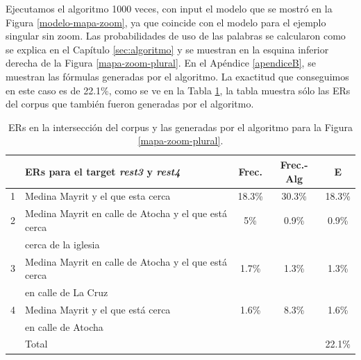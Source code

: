 Ejecutamos el algoritmo 1000 veces, con input el modelo que se mostr\'o en la Figura \ref{modelo-mapa-zoom}, ya que coincide con el modelo para el ejemplo singular sin zoom. Las probabilidades de uso de las palabras se calcularon como se explica en el Cap\'itulo \ref{sec:algoritmo} y se muestran en la esquina inferior derecha de la Figura \ref{mapa-zoom-plural}. En el Ap\'endice \ref{apendiceB}, se muestran las f\'ormulas generadas por el algoritmo. La exactitud que conseguimos en este caso es de 22.1\%, como se ve en la Tabla \ref{compara-mapa-pluralFin}, la tabla muestra s\'olo las ERs del corpus que tambi\'en fueron generadas por el algoritmo.

\bigskip

\begin{table}[h]
{\footnotesize
\begin{center}
\begin{tabular}{|l|l|c|c|c|}
\hline
&ERs para el target {\it rest3} y {\it rest4}				  &  Frec.  & Frec.-Alg &E\\ \hline \hline
1&Medina Mayrit y el que esta cerca        					  &	18.3\%  &   30.3\%  &18.3\% \\ \hline

2&Medina Mayrit en calle de Atocha y el que est\'a cerca      &   5\%	&  0.9\% &0.9\% \\
&cerca de la iglesia				                          &	        &		& \\ \hline
3 & Medina Mayrit en calle de Atocha y el que est\'a cerca	  &  1.7\%  &  1.3\%& 1.3\% \\
&en calle de La Cruz	                                      &	        &		& \\ \hline

4&Medina Mayrit y el que est\'a cerca			              &  1.6\%  &	8.3\%& 1.6\% \\
&en calle de Atocha                                      	  &	        &		 &\\ \hline

&Total&                                                    	  &	 & 22.1\% \\  \hline

\end{tabular}
\caption{ERs en la intersecci\'on del corpus y las generadas por el algoritmo para la Figura \ref{mapa-zoom-plural}.}\label{compara-mapa-pluralFin}
\end{center}
}
\end{table}



